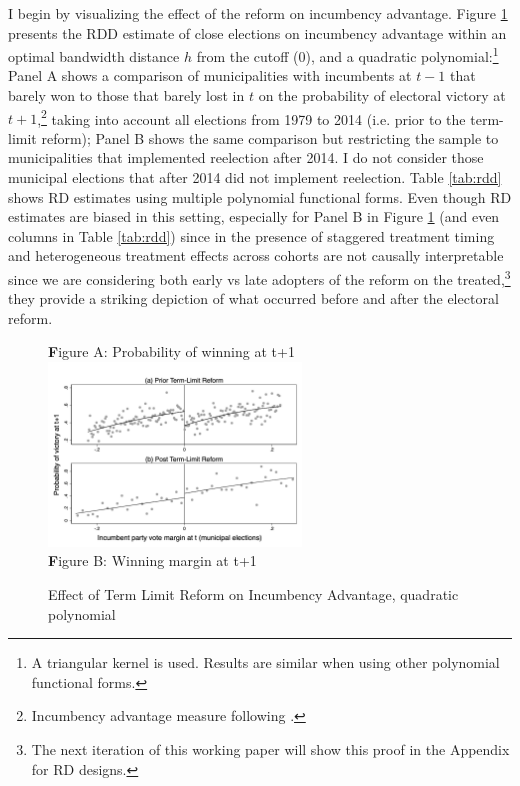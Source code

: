 \documentclass[12pt]{amsart}
\numberwithin{equation}{section}
\theoremstyle{definition}
\theoremstyle{definition}
\theoremstyle{definition}
\begin{document}
\begin{appendix}
I begin by visualizing the effect of the reform on incumbency advantage.  Figure \ref{fig:incumbency_advantage} presents the RDD estimate of close elections on incumbency advantage  within an optimal bandwidth distance $h$ from the cutoff (0), and a quadratic polynomial:\footnote{A triangular kernel is used. Results are similar when using other polynomial functional forms.} Panel A shows a comparison of municipalities with incumbents at $t-1$ that barely won to those that barely lost in $t$ on the probability of electoral victory at $t+1$,\footnote{Incumbency advantage measure following \citet{klasnja_titiunik_2017}.} taking into account all elections from 1979 to 2014 (i.e. prior to the term-limit reform); Panel B shows the same comparison but restricting the sample to municipalities that implemented reelection after 2014. I do not consider those municipal elections that after 2014 did not implement reelection. Table \ref{tab:rdd} shows RD estimates using multiple polynomial functional forms. Even though RD estimates are biased in this setting, especially for Panel B in Figure \ref{fig:incumbency_advantage} (and even columns in Table \ref{tab:rdd}) since in the presence of staggered treatment timing and heterogeneous treatment effects across cohorts are not causally interpretable since we are considering both early vs late adopters of the reform on the treated,\footnote{The next iteration of this working paper will show this proof in the Appendix for RD designs.} they provide a striking depiction of what occurred before and after the electoral reform. 


\begin{figure}[H]
\centering
\caption{Effect of Term Limit Reform on Incumbency Advantage, quadratic polynomial}
  \label{fig:incumbency_advantage} 

	{\textbf Figure A: Probability of winning at t+1}
	 \includegraphics[width=0.6\textwidth]{Figures_incumbency/RDD_incumbency_pol2.png}
	 \\
	{\textbf Figure B: Winning margin at t+1}


\end{figure}
\end{appendix}
\end{document}
